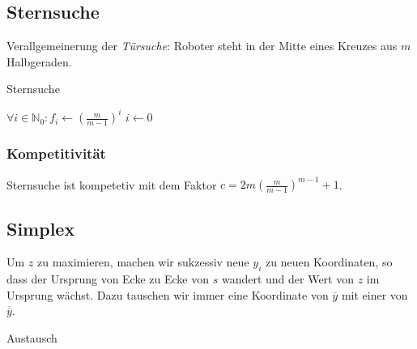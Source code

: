 \subsection{Sternsuche}
Verallgemeinerung der \textit{Türsuche}: Roboter steht in der Mitte eines Kreuzes aus \(m\) Halbgeraden.

\begin{algorithm}[H]
	\caption{Sternsuche}
        
    \BlankLine

    $\forall i \in \mathbb{N}_0 : f_i \leftarrow \left(\frac{m}{m-1}\right)^i$
	$i \longleftarrow 0$
	
\end{algorithm}

\subsubsection{Kompetitivität}
Sternsuche ist kompetetiv mit dem Faktor \(c = 2m \left(\frac{m}{m-1}\right)^{m-1}+1\).


\subsection{Simplex}
Um \(z\) zu maximieren, machen wir sukzessiv neue \(y_i\) zu neuen Koordinaten, so dass der Ursprung von Ecke zu Ecke von \(s\) wandert und der Wert von \(z\) im Ursprung wächst. Dazu tauschen wir immer eine Koordinate von \(\overline{y}\) mit einer von \(\overline{\overline{y}}\).

\begin{algorithm}[H]
	\caption{Austausch}

	\BlankLine
	
	\BlankLine

	\BlankLine

	\BlankLine

\end{algorithm}

